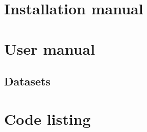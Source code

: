 \documentclass{ucl_thesis}
\begin{document}








\cleardoublepage
\appendix


\setlength{\oddsidemargin}{0.5in}
\setlength{\evensidemargin}{0.5in}
\setlength{\topmargin}{-0.2in}
\addtolength{\textwidth}{1in}
\addtolength{\textheight}{1in}

\chapter{Installation manual}  \label{app:install}


\chapter{User manual}  \label{app:usage}


\begin{landscape}
\chapter{Datasets}  \label{app:datasets}

\end{landscape}

\chapter{Code listing}  \label{app:code}

\end{document}

